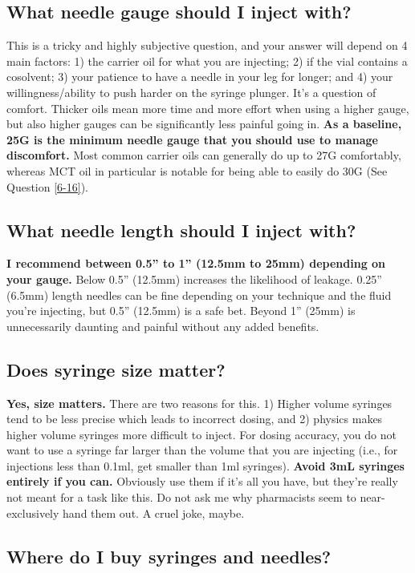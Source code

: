 \documentclass{article}
\begin{document}
{{\subsection{What needle gauge should I inject with?}\label{5-16}

This is a tricky and highly subjective question, and your answer will depend on 4 main factors: 1) the carrier oil for what you are injecting; 2) if the vial contains a cosolvent; 3) your patience to have a needle in your leg for longer; and 4) your willingness/ability to push harder on the syringe plunger. It’s a question of comfort. Thicker oils mean more time and more effort when using a higher gauge, but also higher gauges can be significantly less painful going in. \textbf{As a baseline, 25G is the minimum needle gauge that you should use to manage discomfort. }Most common carrier oils can generally do up to 27G comfortably, whereas MCT oil in particular is notable for being able to easily do 30G (See Question \ref{6-16}).

\subsection{What needle length should I inject with?}

\textbf{I recommend between 0.5” to 1” (12.5mm to 25mm) depending on your gauge.} Below 0.5” (12.5mm) increases the likelihood of leakage. 0.25” (6.5mm) length needles can be fine depending on your technique and the fluid you’re injecting, but 0.5” (12.5mm) is a safe bet. Beyond 1” (25mm) is unnecessarily daunting and painful without any added benefits.

\subsection{Does syringe size matter?}

\textbf{Yes, size matters.} There are two reasons for this. 1) Higher volume syringes tend to be less precise which leads to incorrect dosing, and 2) physics makes higher volume syringes more difficult to inject. For dosing accuracy, you do not want to use a syringe far larger than the volume that you are injecting (i.e., for injections less than 0.1ml, get smaller than 1ml syringes). \textbf{Avoid 3mL syringes entirely if you can.} Obviously use them if it’s all you have, but they’re really not meant for a task like this. Do not ask me why pharmacists seem to near-exclusively hand them out. A cruel joke, maybe.

\subsection{Where do I buy syringes and needles?}

}}
\end{document}
